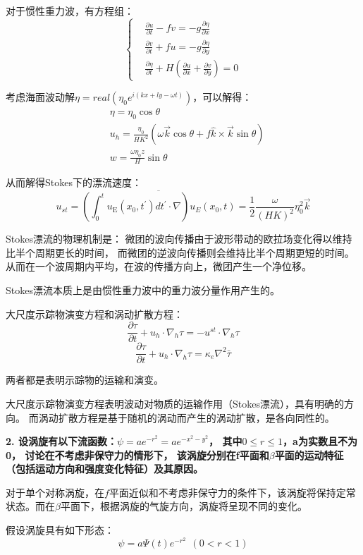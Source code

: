 \documentclass{article}
\begin{document}
对于惯性重力波，有方程组：
$$\begin{cases}
    &\frac{\partial u}{\partial t}-fv=-g\frac{\partial \eta}{\partial x}\\
    &\frac{\partial v}{\partial t}+fu=-g\frac{\partial \eta}{\partial y}\\
    &\frac{\partial \eta}{\partial t}+H(\frac{\partial u}{\partial x}+\frac{\partial v}{\partial y} ) = 0
\end{cases}$$

考虑海面波动解$\eta = real(\eta_0e^{i(kx+ly-\omega t)})$，可以解得：
\begin{align}
    &\eta = \eta_0\cos\theta \\
    &u_h = \frac{\eta_0}{HK^2}(\omega\vec{k}\cos\theta + f\hat{k}\times\vec{k}\sin\theta)\\
    &w = \frac{\omega\eta_0z}{H}\sin\theta
\end{align}

从而解得Stokes下的漂流速度：
$$u_{st}=\overline{(\int_{0}^{t}{{{u}_{\text{E}}}({{x}_{0}},t^{\prime})}dt^{\prime}\cdot \nabla ){{u}_{E}}({{x}_{0}},t)} = \frac{1}{2}\frac{\omega}{(HK)^2}\eta_0^2\vec{k}$$

Stokes漂流的物理机制是：
微团的波向传播由于波形带动的欧拉场变化得以维持比半个周期更长的时间，
而微团的逆波向传播则会维持比半个周期更短的时间。
从而在一个波周期内平均，在波的传播方向上，微团产生一个净位移。

Stokes漂流本质上是由惯性重力波中的重力波分量作用产生的。

大尺度示踪物演变方程和涡动扩散方程：
$$\frac{\partial \tau }{\partial t}+{{u}_{h}}\cdot {{\nabla }_{h}}\tau 
=-{{u}^{st}}\cdot {{\nabla }_{h}}\tau$$
$$\frac{\partial \tau }{\partial t}+{{u}_{h}}\cdot {{\nabla }_{h}}\tau 
={{\kappa }_{e}}\nabla^2\bar{\tau }$$

两者都是表明示踪物的运输和演变。

大尺度示踪物演变方程表明波动对物质的运输作用（Stokes漂流），具有明确的方向。
而涡动扩散方程是基于随机的涡动而产生的涡动扩散，是各向同性的。


\textbf{2. 设涡旋有以下流函数：$\psi = ae^{-r^2} = ae^{-x^2-y^2}$，
其中$0\le r\le 1$，a为实数且不为0，
讨论在不考虑非保守力的情形下，
该涡旋分别在f平面和$\beta$平面的运动特征（包括运动方向和强度变化特征）及其原因。}

对于单个对称涡旋，在$f$平面近似和不考虑非保守力的条件下，该涡旋将保持定常状态。而在$\beta$平面下，根据涡旋的气旋方向，涡旋将呈现不同的变化。

假设涡旋具有如下形态：
$$\psi = a\Psi(t)e^{-r^2} \ \ (0<r<1)$$
\end{document}
